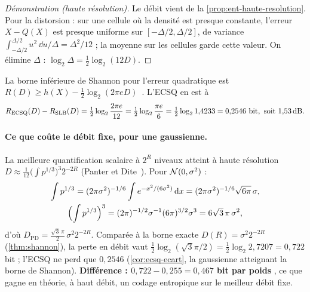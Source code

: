 \begin{proof}[Démonstration (haute résolution)]
Le débit vient de la \cref{prop:ent-haute-resolution}. Pour la distorsion : sur une cellule où la densité est presque constante, l'erreur $X - Q(X)$ est presque uniforme sur $[-\Delta/2, \Delta/2]$, de variance $\int_{-\Delta/2}^{\Delta/2} u^2\,\dd u/\Delta = \Delta^2/12$ ; la moyenne sur les cellules garde cette valeur. On élimine $\Delta$ : $\log_2 \Delta = \tfrac12\log_2(12 D)$.
\end{proof}

\begin{corollaire}\label{cor:ecsq-ecart}
La borne inférieure de Shannon pour l'erreur quadratique est $R(D) \ge h(X) - \tfrac12\log_2(2\pi e D)$~\cite{cover2006}. L'ECSQ en est à
\[
R_{\mathrm{ECSQ}}(D) - R_{\mathrm{SLB}}(D) = \tfrac12 \log_2 \frac{2\pi e}{12} = \tfrac12 \log_2 \frac{\pi e}{6} = \tfrac12 \log_2 1{,}4233 = 0{,}2546 \text{ bit}, \text{ soit } 1{,}53\text{\,dB}.
\]
\end{corollaire}

\paragraph{Ce que coûte le débit fixe, pour une gaussienne.} La meilleure quantification scalaire à $2^R$ niveaux atteint à haute résolution $D \approx \tfrac1{12}\bigl(\int p^{1/3}\bigr)^3 2^{-2R}$ (Panter et Dite~\cite{panter1951}). Pour $\mathcal{N}(0, \sigma^2)$ :
\begin{gather*}
\int p^{1/3} = (2\pi\sigma^2)^{-1/6} \int e^{-x^2/(6\sigma^2)}\,\mathrm{d} x = (2\pi\sigma^2)^{-1/6}\sqrt{6\pi}\,\sigma, \\
\Bigl(\int p^{1/3}\Bigr)^3 = (2\pi)^{-1/2}\sigma^{-1}(6\pi)^{3/2}\sigma^3 = 6\sqrt3\,\pi\,\sigma^2,
\end{gather*}
d'où $D_{\mathrm{PD}} = \tfrac{\sqrt3\,\pi}{2}\,\sigma^2 2^{-2R}$. Comparée à la borne exacte $D(R) = \sigma^2 2^{-2R}$ (\cref{thm:shannon}), la perte en débit vaut $\tfrac12\log_2(\sqrt3\pi/2) = \tfrac12\log_2 2{,}7207 = 0{,}722$ bit ; l'ECSQ ne perd que $0{,}2546$ (\cref{cor:ecsq-ecart}, la gaussienne atteignant la borne de Shannon). \textbf{Différence : $0{,}722 - 0{,}255 = 0{,}467$ bit par poids} \calc, ce que gagne en théorie, à haut débit, un codage entropique sur le meilleur débit fixe.

